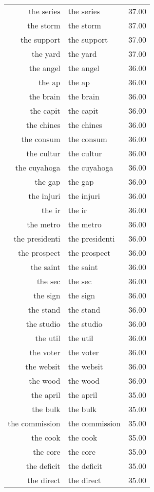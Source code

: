 \begin{table}[ht]
\begin{tabular}{rlr}
  the series & the series & 37.00 \\ 
  the storm & the storm & 37.00 \\ 
  the support & the support & 37.00 \\ 
  the yard & the yard & 37.00 \\ 
  the angel & the angel & 36.00 \\ 
  the ap & the ap & 36.00 \\ 
  the brain & the brain & 36.00 \\ 
  the capit & the capit & 36.00 \\ 
  the chines & the chines & 36.00 \\ 
  the consum & the consum & 36.00 \\ 
  the cultur & the cultur & 36.00 \\ 
  the cuyahoga & the cuyahoga & 36.00 \\ 
  the gap & the gap & 36.00 \\ 
  the injuri & the injuri & 36.00 \\ 
  the ir & the ir & 36.00 \\ 
  the metro & the metro & 36.00 \\ 
  the presidenti & the presidenti & 36.00 \\ 
  the prospect & the prospect & 36.00 \\ 
  the saint & the saint & 36.00 \\ 
  the sec & the sec & 36.00 \\ 
  the sign & the sign & 36.00 \\ 
  the stand & the stand & 36.00 \\ 
  the studio & the studio & 36.00 \\ 
  the util & the util & 36.00 \\ 
  the voter & the voter & 36.00 \\ 
  the websit & the websit & 36.00 \\ 
  the wood & the wood & 36.00 \\ 
  the april & the april & 35.00 \\ 
  the bulk & the bulk & 35.00 \\ 
  the commission & the commission & 35.00 \\ 
  the cook & the cook & 35.00 \\ 
  the core & the core & 35.00 \\ 
  the deficit & the deficit & 35.00 \\ 
  the direct & the direct & 35.00 \\ 

\end{tabular}
\end{table}
